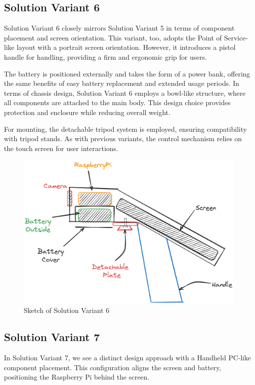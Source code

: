 \subsection{Solution Variant 6}
Solution Variant 6 closely mirrors Solution Variant 5 in terms of component placement and screen orientation. This variant, too, adopts the Point of Service-like layout with a portrait screen orientation. However, it introduces a pistol handle for handling, providing a firm and ergonomic grip for users.

The battery is positioned externally and takes the form of a power bank, offering the same benefits of easy battery replacement and extended usage periods. In terms of chassis design, Solution Variant 6 employs a bowl-like structure, where all components are attached to the main body. This design choice provides protection and enclosure while reducing overall weight.

For mounting, the detachable tripod system is employed, ensuring compatibility with tripod stands. As with previous variants, the control mechanism relies on the touch screen for user interactions.

\begin{figure}[H]
    \centering
    \includegraphics[width=\linewidth]{texs/Part1/chapter3/image/v6.png}
    \caption{Sketch of Solution Variant 6}
    \label{fig:sketch-solution-variant-6}
\end{figure}

\subsection{Solution Variant 7}
In Solution Variant 7, we see a distinct design approach with a Handheld PC-like component placement. This configuration aligns the screen and battery, positioning the Raspberry Pi behind the screen.

